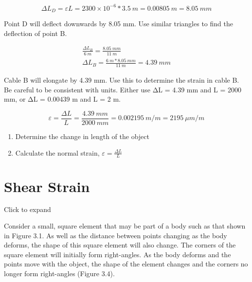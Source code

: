 \documentclass[
  letterpaper,
  DIV=11,
  numbers=noendperiod]{scrreprt}
\providecommand{\tightlist}{%
  \setlength{\itemsep}{0pt}\setlength{\parskip}{0pt}}\usepackage{longtable,booktabs,array}
\theoremstyle{definition}
\theoremstyle{remark}
\begin{document}
\begin{tcolorbox}
\begin{tcolorbox}
\[
\Delta L_D=\varepsilon L=2300 \times 10^{-6} * 3.5{~m}=0.00805 {~m}=8.05 {~mm}
\]

Point D will deflect downwards by 8.05 mm. Use similar triangles to find
the deflection of point B.

\[
\begin{gathered}
\frac{\Delta L_B}{6{~m}}=\frac{8.05{~mm}}{11{~m}} \\
\Delta L_B=\frac{6{~m} * 8.05{~mm}}{11{~m}}=4.39{~mm}
\end{gathered}
\]

Cable B will elongate by 4.39 mm. Use this to determine the strain in
cable B. Be careful to be consistent with units. Either use ΔL = 4.39 mm
and L = 2000 mm, or ΔL = 0.00439 m and L = 2 m.

\[
\varepsilon=\frac{\Delta L}{L}=\frac{4.39{~mm}}{2000{~mm}}=0.002195{~m}/{m}=2195 ~\mu{m} /{m}
\]

\end{tcolorbox}

\end{tcolorbox}

\begin{tcolorbox}[enhanced jigsaw, leftrule=.75mm, colbacktitle=quarto-callout-warning-color!10!white, breakable, opacityback=0, colback=white, titlerule=0mm, toprule=.15mm, colframe=quarto-callout-warning-color-frame, coltitle=black, title={Step-by-step: Normal strain}, toptitle=1mm, bottomrule=.15mm, rightrule=.15mm, left=2mm, arc=.35mm, opacitybacktitle=0.6, bottomtitle=1mm]

\begin{enumerate}
\def\labelenumi{\arabic{enumi}.}
\tightlist
\item
  Determine the change in length of the object
\item
  Calculate the normal strain, \(\varepsilon=\frac{\Delta L}{L}\)
\end{enumerate}

\end{tcolorbox}

\section{Shear Strain}\label{sec-3.2}

Click to expand

Consider a small, square element that may be part of a body such as that
shown in Figure 3.1. As well as the distance between points changing as
the body deforms, the shape of this square element will also change. The
corners of the square element will initially form right-angles. As the
body deforms and the points move with the object, the shape of the
element changes and the corners no longer form right-angles (Figure
3.4).
\end{document}
